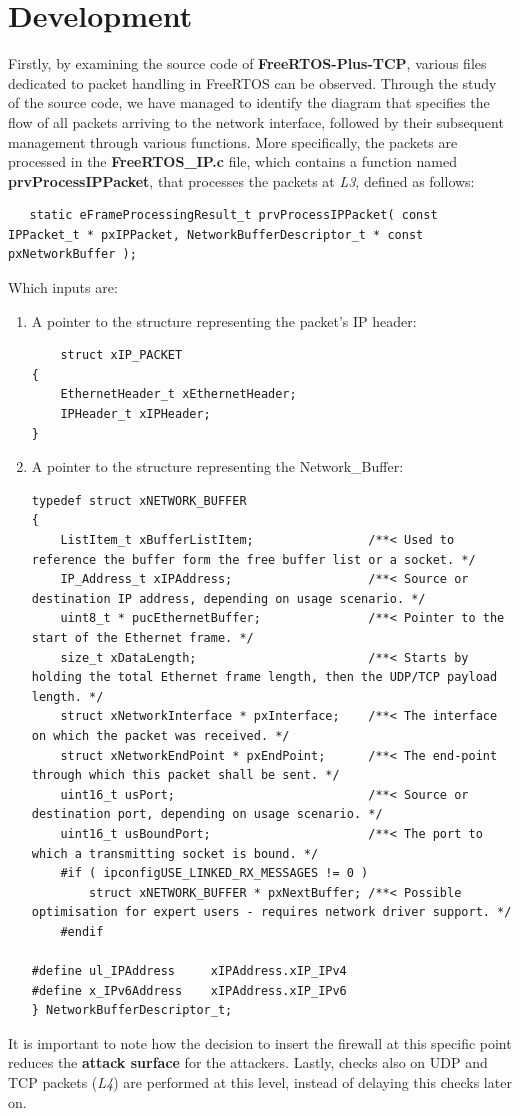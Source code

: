 \documentclass{exam}
\begin{document}
\section{Development}

Firstly, by examining the source code of \textbf{FreeRTOS-Plus-TCP}, various files dedicated to packet handling in FreeRTOS can be observed. Through the study of the source code, we have managed to identify the diagram that specifies the flow of all packets arriving to the network interface, followed by their subsequent management through various functions.
More specifically, the packets are processed in the \textbf{FreeRTOS\_IP.c} file, which contains a function named \textbf{prvProcessIPPacket}, that processes the packets at \textit{L3}, defined as follows:

\begin{lstlisting}
   static eFrameProcessingResult_t prvProcessIPPacket( const IPPacket_t * pxIPPacket, NetworkBufferDescriptor_t * const pxNetworkBuffer );
\end{lstlisting}
Which inputs are:
\begin{enumerate}
\item A pointer to the structure representing the packet's IP header:
\begin{lstlisting}
    struct xIP_PACKET
{
    EthernetHeader_t xEthernetHeader;
    IPHeader_t xIPHeader;
}
\end{lstlisting}
\item A pointer to the structure representing the Network\_Buffer:
\begin{lstlisting}
typedef struct xNETWORK_BUFFER
{
    ListItem_t xBufferListItem;                /**< Used to reference the buffer form the free buffer list or a socket. */
    IP_Address_t xIPAddress;                   /**< Source or destination IP address, depending on usage scenario. */
    uint8_t * pucEthernetBuffer;               /**< Pointer to the start of the Ethernet frame. */
    size_t xDataLength;                        /**< Starts by holding the total Ethernet frame length, then the UDP/TCP payload length. */
    struct xNetworkInterface * pxInterface;    /**< The interface on which the packet was received. */
    struct xNetworkEndPoint * pxEndPoint;      /**< The end-point through which this packet shall be sent. */
    uint16_t usPort;                           /**< Source or destination port, depending on usage scenario. */
    uint16_t usBoundPort;                      /**< The port to which a transmitting socket is bound. */
    #if ( ipconfigUSE_LINKED_RX_MESSAGES != 0 )
        struct xNETWORK_BUFFER * pxNextBuffer; /**< Possible optimisation for expert users - requires network driver support. */
    #endif

#define ul_IPAddress     xIPAddress.xIP_IPv4
#define x_IPv6Address    xIPAddress.xIP_IPv6
} NetworkBufferDescriptor_t;
\end{lstlisting}
\end{enumerate}
It is important to note how the decision to insert the firewall at this specific point reduces the \textbf{attack surface} for the attackers. Lastly, checks also on UDP and TCP packets (\textit{L4}) are performed at this level, instead of delaying this checks later on.
\end{document}
